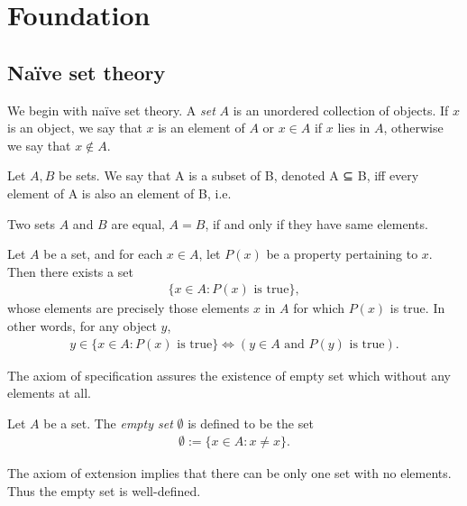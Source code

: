 
\chapter{Foundation}

\section{Na\"ive set theory}

We begin with na\"ive set theory. A \emph{set} $A$ is an unordered collection of objects. If $x$ is an object, we say that $x$ is an element of $A$ or $x \in A$ if $x$ lies in $A$, otherwise we say that $x \notin A$.

Let $A, B$ be sets. We say that A is a subset of B, denoted A ⊆ B, iff every element of A is also an element of B, i.e.

\begin{axiom}
    Two sets $A$ and $B$ are equal, $A = B$, if and only if they have same elements.
\end{axiom}



\begin{axiom}
    Let $A$ be a set, and for each $x \in A$, let $P(x)$ be a property pertaining to $x$. Then there exists a set 
    \begin{align*}
        \{x \in A : P(x) \text{ is true}\},
    \end{align*}
    whose elements are precisely those elements $x$ in $A$ for which $P(x)$ is true. In other words, for any object $y$,
        \begin{align*}
            y \in \{x \in A : P(x) \text{ is true}\}
            \Longleftrightarrow 
            (y \in A \text{ and } P(y) \text{ is true}).
        \end{align*}
\end{axiom}

The axiom of specification assures the existence of empty set which without any elements at all.

\begin{definition}
    Let $A$ be a set. The \emph{empty set} $\emptyset$ is defined to be the set
        \begin{align*}
            \emptyset := \{x \in A : x \neq x\}.
        \end{align*}
\end{definition}

The axiom of extension implies that there can be only one set with no elements. Thus the empty set is well-defined.
